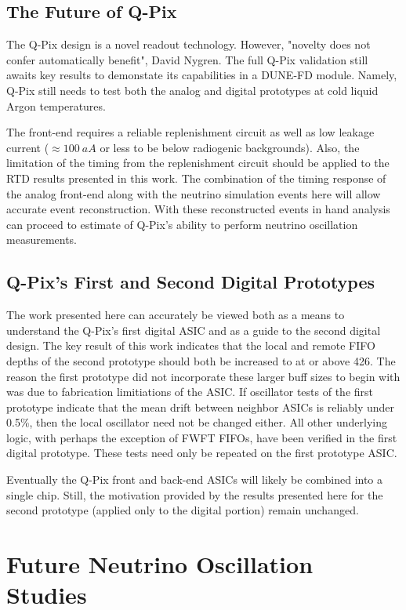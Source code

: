 \subsection{The Future of Q-Pix}

The Q-Pix design is a novel readout technology.
However, "novelty does not confer automatically benefit", David Nygren.
The full Q-Pix validation still awaits key results to demonstate its capabilities in a DUNE-FD module.
Namely, Q-Pix still needs to test both the analog and digital prototypes at cold liquid Argon temperatures.

The front-end requires a reliable replenishment circuit as well as low leakage current ($\approx 100~\unit{aA}$ or less to be below radiogenic backgrounds).
Also, the limitation of the timing from the replenishment circuit should be applied to the RTD results presented in this work.
The combination of the timing response of the analog front-end along with the neutrino simulation events here will allow accurate event reconstruction.
With these reconstructed events in hand analysis can proceed to estimate of Q-Pix's ability to perform neutrino oscillation measurements.

\subsection{Q-Pix's First and Second Digital Prototypes}

The work presented here can accurately be viewed both as a means to understand the Q-Pix's first digital ASIC and as a guide to the second digital design.
The key result of this work indicates that the local and remote FIFO depths of the second prototype should both be increased to at or above 426.
The reason the first prototype did not incorporate these larger buff sizes to begin with was due to fabrication limitiations of the ASIC.
If oscillator tests of the first prototype indicate that the mean drift between neighbor ASICs is reliably under 0.5\%, then the local oscillator need not be changed either.
All other underlying logic, with perhaps the exception of FWFT FIFOs, have been verified in the first digital prototype.
These tests need only be repeated on the first prototype ASIC.

Eventually the Q-Pix front and back-end ASICs will likely be combined into a single chip.
Still, the motivation provided by the results presented here for the second prototype (applied only to the digital portion) remain unchanged.

\section{Future Neutrino Oscillation Studies}

